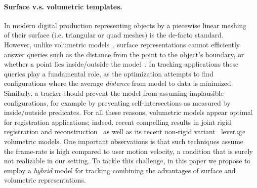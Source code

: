 \paragraph{Surface v.s. volumetric templates.}
In modern digital production representing objects by a piecewise linear meshing of their surface (i.e. triangular or quad meshes) is the de-facto standard. However, unlike volumetric models~\cite{bloomenthal1997book}, surface representations cannot efficiently answer queries such as the distance from the point to the object's boundary, or whether a point lies inside/outside the model~\cite[Ch.1]{botsch2010book}. In tracking applications these queries play a fundamental role, as the optimization attempts to find configurations where the average \emph{distance} from model to data is minimized. Similarly, a tracker should prevent the model from assuming implausible configurations, for example by preventing self-intersections as measured by inside/outside predicates. For all these reasons, volumetric models appear optimal for registration applications; indeed, recent compelling results in joint rigid registration and reconstruction~\cite{newcombe2011kinfu} as well as its recent non-rigid variant~\cite{newcombe2015dynfusion} leverage volumetric models. One important observations is that such techniques assume the frame-rate is high compared to user motion velocity, a condition that is surely not realizable in our setting.  To tackle this challenge, in this paper we propose to employ a \emph{hybrid} model for tracking combining the advantages of surface and volumetric representations.



